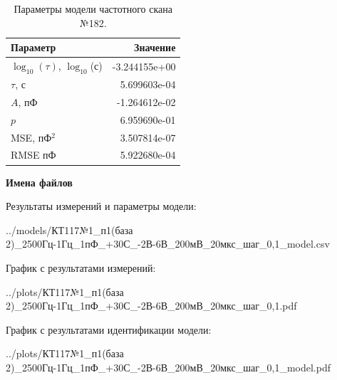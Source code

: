 \begin{table}[!ht]
    \centering
    \caption{Параметры модели частотного скана №182.}
    \begin{tabular}{|l|r|}
        \hline
        Параметр                                       & Значение                  \\ \hline
        $\log_{10}(\tau)$, $\log_{10}$(с)              & -3.244155e+00             \\ \hline
        $\tau$, с                                      & 5.699603e-04              \\ \hline
        $A$, пФ                                        & -1.264612e-02             \\ \hline
        $p$                                            & 6.959690e-01              \\ \hline
        MSE, пФ$^2$                                    & 3.507814e-07              \\ \hline
        RMSE пФ                                        & 5.922680e-04              \\ \hline
    \end{tabular}
    \label{table:frequency_scan_model_182}
\end{table}

\textbf{Имена файлов}

Результаты измерений и параметры модели:

\scriptsize../models/КТ117№1\_п1(база 2)\_2500Гц-1Гц\_1пФ\_+30С\_-2В-6В\_200мВ\_20мкс\_шаг\_0,1\_model.csv
\normalsize

График с результатами измерений:

\scriptsize../plots/КТ117№1\_п1(база 2)\_2500Гц-1Гц\_1пФ\_+30С\_-2В-6В\_200мВ\_20мкс\_шаг\_0,1.pdf
\normalsize

График с результатами идентификации модели:

\scriptsize../plots/КТ117№1\_п1(база 2)\_2500Гц-1Гц\_1пФ\_+30С\_-2В-6В\_200мВ\_20мкс\_шаг\_0,1\_model.pdf
\normalsize

